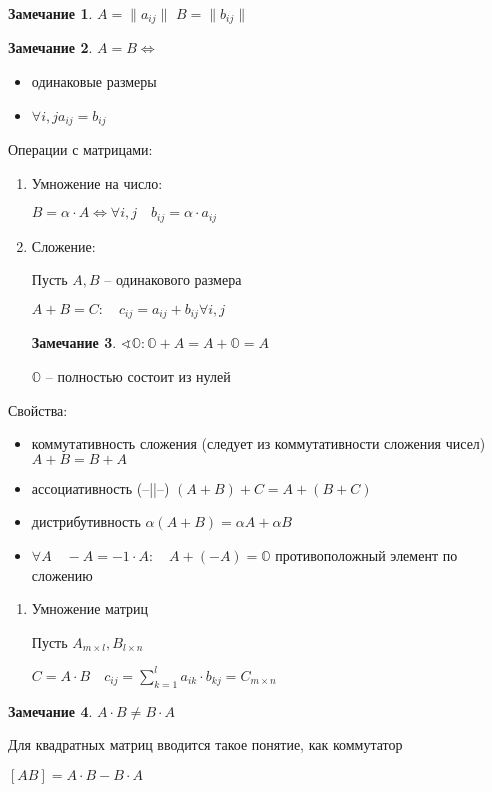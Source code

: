 \documentclass{book}
\theoremstyle{definition}
\newtheorem*{note}{Замечание}
\begin{document}
     \begin{note}
         $A = \| a_{ij} \|$ $B = \| b_{ij} \|$
     \end{note}
    
     \begin{note}
         $A=B \iff $
         \begin{itemize}
             \item одинаковые размеры
             \item $\forall i, j a_{ij} = b_{ij}$
         \end{itemize}
     \end{note}

     Операции с матрицами:
     \begin{enumerate}
         \item Умножение на число:

             $B = \alpha \cdot A \iff  \forall i, j\quad b_{ij} = \alpha \cdot a_{ij}$
         \item Сложение:

             Пусть $A,B$ -- одинакового размера

             $A+B = C :\quad c_{ij} = a_{ij} + b_{ij} \forall i,j$

             \begin{note}
                 $\sphericalangle \mathbb{O}: \mathbb{O} + A = A+ \mathbb{O} = A$

                 $\mathbb{O}$ -- полностью состоит из нулей
             \end{note}
     \end{enumerate}

     Свойства:
     \begin{itemize}
         \item коммутативность сложения (следует из коммутативности сложения чисел) $A+B = B+A$
         \item ассоциативность (--||--) $(A+B)+C = A+(B+C)$
         \item дистрибутивность $\alpha(A+B) = \alpha A + \alpha B$
         \item $\forall A\quad -A = -1\cdot A:\quad A+(-A)= \mathbb{O}$ противоположный элемент по сложению
     \end{itemize}

     \begin{enumerate}
         \item [3] Умножение матриц
             
             Пусть $A_{m\times l}, B_{l\times n}$

             $C = A\cdot B\quad c_{ij} = \sum_{k=1}^{l} a_{ik}\cdot b_{kj}= C_{m\times n}$
     \end{enumerate}
\begin{note}
    $A\cdot B \neq B\cdot A$

    Для квадратных матриц вводится такое понятие, как коммутатор 

    $[AB] = A\cdot B - B\cdot A$
\end{note}
\end{document}
